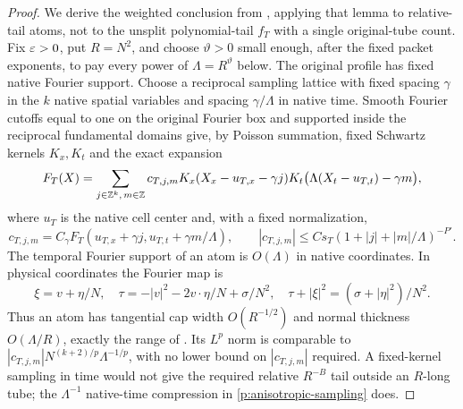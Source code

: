 \begin{proof}
We derive the weighted conclusion from , applying
that lemma to relative-tail atoms, not to the unsplit polynomial-tail
$f_T$ with a single original-tube count.  Fix $\varepsilon>0$, put $R=N^2$, and
choose $\vartheta>0$ small enough, after the fixed packet exponents, to
pay every power of $\Lambda=R^\vartheta$ below.  The original profile has
fixed native Fourier support.  Choose a reciprocal sampling lattice with
fixed spacing $\gamma$ in the $k$ native spatial variables and spacing
$\gamma/\Lambda$ in native time.  Smooth Fourier cutoffs equal to one on
the original Fourier box and supported inside the reciprocal fundamental
domains give, by Poisson summation, fixed Schwartz kernels $K_x,K_t$ and
the exact expansion
\begin{equation}\label{p:anisotropic-sampling}
 F_T(X)=\sum_{j\in\mathbb Z^k,\,m\in\mathbb Z}c_{T,j,m}
 K_x(X_x-u_{T,x}-\gamma j)
 K_t\bigl(\Lambda(X_t-u_{T,t})-\gamma m\bigr),
\end{equation}
where $u_T$ is the native cell center and, with a fixed normalization,
\[
 c_{T,j,m}=C_\gamma F_T(u_{T,x}+\gamma j,
                              u_{T,t}+\gamma m/\Lambda),\qquad
 |c_{T,j,m}|\leq C s_T
 (1+|j|+|m|/\Lambda)^{-P'}.
\]
The temporal Fourier support of an atom is $O(\Lambda)$ in native
coordinates.  In physical coordinates the Fourier map is
\[
 \xi=v+\eta/N,\quad
 \tau=-|v|^2-2v\cdot\eta/N+\sigma/N^2,\quad
 \tau+|\xi|^2=(\sigma+|\eta|^2)/N^2.
\]
Thus an atom has tangential cap width $O(R^{-1/2})$ and normal thickness
$O(\Lambda/R)$, exactly the range of .  Its
$L^p$ norm is comparable to
$|c_{T,j,m}|N^{(k+2)/p}\Lambda^{-1/p}$, with no lower bound on
$|c_{T,j,m}|$ required.  A fixed-kernel sampling in time would not give
the required relative $R^{-B}$ tail outside an $R$-long tube; the
$\Lambda^{-1}$ native-time compression in
\eqref{p:anisotropic-sampling} does.


\end{proof}
